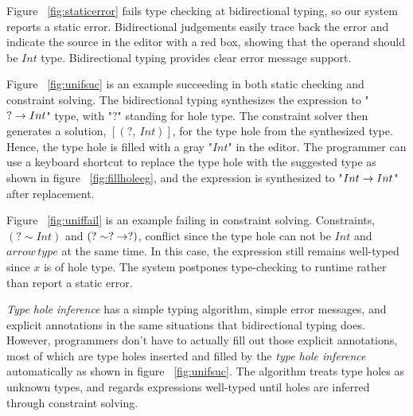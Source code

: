 \par Figure ~\ref{fig:staticerror} fails type checking at bidirectional typing, so our system reports a static error. Bidirectional judgements easily trace back the error and indicate the source in the editor with a red box, showing that the operand should be $Int$ type. Bidirectional typing provides clear error message support.\par 
Figure ~\ref{fig:unifsuc} is an example succeeding in both static checking and constraint solving. The bidirectional typing synthesizes the expression to "$? \rightarrow Int$" type, with "$?$" standing for hole type. The constraint solver then generates a solution, $[(?,~ Int)]$, for the type hole from the synthesized type. Hence, the type hole is filled with a gray "$Int$" in the editor. The programmer can use a keyboard shortcut to replace the type hole with the suggested type as shown in figure ~\ref{fig:fillholeeg}, and the expression is synthesized to "$Int \rightarrow Int$" after replacement. \par

Figure ~\ref{fig:uniffail} is an example failing in constraint solving. Constraints, $(? \sim Int)$ and $(? \sim ? \rightarrow ?)$, conflict since the type hole can not be $Int$ and $arrow \, type$ at the same time. In this case, the expression still remains well-typed since $x$ is of hole type. The system postpones type-checking to runtime rather than report a static error.

\emph{Type hole inference} has a simple typing algorithm, simple error messages, and explicit annotations in the same situations that bidirectional typing does. However, programmers don't have to actually fill out those explicit annotations, most of which are type holes inserted and filled by the \emph{type hole inference} automatically as shown in figure ~\ref{fig:unifsuc}. The algorithm treats type holes as unknown types, and regards expressions well-typed until holes are inferred through constraint solving. 


